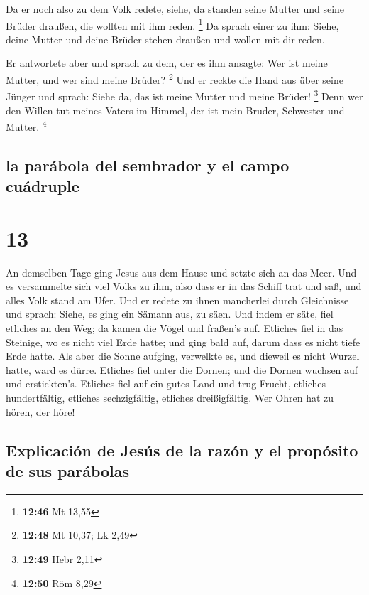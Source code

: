  Da er noch also zu dem Volk redete, siehe, da standen
seine Mutter und seine Brüder draußen, die wollten mit ihm reden.
\footnote{\textbf{12:46} Mt 13,55}  Da sprach einer zu
ihm: Siehe, deine Mutter und deine Brüder stehen draußen und wollen mit
dir reden.

 Er antwortete aber und sprach zu dem, der es ihm
ansagte: Wer ist meine Mutter, und wer sind meine Brüder? \footnote{\textbf{12:48}
  Mt 10,37; Lk 2,49}  Und er reckte die Hand aus über
seine Jünger und sprach: Siehe da, das ist meine Mutter und meine
Brüder! \footnote{\textbf{12:49} Hebr 2,11}  Denn wer den
Willen tut meines Vaters im Himmel, der ist mein Bruder, Schwester und
Mutter. \footnote{\textbf{12:50} Röm 8,29}

\hypertarget{la-paruxe1bola-del-sembrador-y-el-campo-cuuxe1druple}{%
\subsection{la parábola del sembrador y el campo
cuádruple}\label{la-paruxe1bola-del-sembrador-y-el-campo-cuuxe1druple}}

\hypertarget{section-12}{%
\section{13}\label{section-12}}

 An demselben Tage ging Jesus aus dem Hause und setzte
sich an das Meer.  Und es versammelte sich viel Volks zu
ihm, also dass er in das Schiff trat und saß, und alles Volk stand am
Ufer.  Und er redete zu ihnen mancherlei durch Gleichnisse
und sprach: Siehe, es ging ein Sämann aus, zu säen.  Und
indem er säte, fiel etliches an den Weg; da kamen die Vögel und fraßen's
auf.  Etliches fiel in das Steinige, wo es nicht viel Erde
hatte; und ging bald auf, darum dass es nicht tiefe Erde hatte.
 Als aber die Sonne aufging, verwelkte es, und dieweil es
nicht Wurzel hatte, ward es dürre.  Etliches fiel unter
die Dornen; und die Dornen wuchsen auf und erstickten's. 
Etliches fiel auf ein gutes Land und trug Frucht, etliches
hundertfältig, etliches sechzigfältig, etliches dreißigfältig.
 Wer Ohren hat zu hören, der höre!

\hypertarget{explicaciuxf3n-de-jesuxfas-de-la-razuxf3n-y-el-propuxf3sito-de-sus-paruxe1bolas}{%
\subsection{Explicación de Jesús de la razón y el propósito de sus
parábolas}\label{explicaciuxf3n-de-jesuxfas-de-la-razuxf3n-y-el-propuxf3sito-de-sus-paruxe1bolas}}

